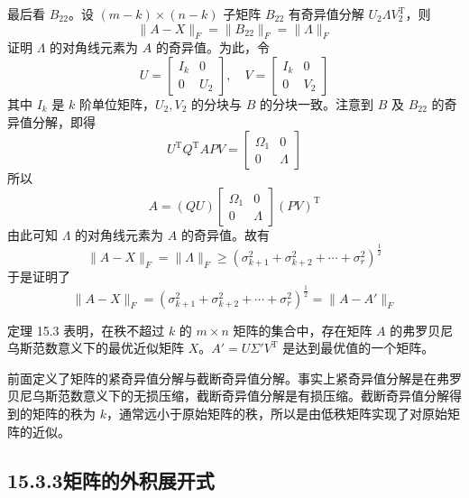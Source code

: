 \documentclass[UTF8,12pt,a4paper,fontset=fandol]{ctexart}
\begin{document}
最后看 $B_{22}$。设 $(m-k)\times(n-k)$ 子矩阵 $B_{22}$ 有奇异值分解 $U_2\Lambda V_2^{\mathrm{T}}$，则
\begin{equation}
\|A-X\|_F=\|B_{22}\|_F=\|\Lambda\|_F
\tag{15.41}
\end{equation}
证明 $\Lambda$ 的对角线元素为 $A$ 的奇异值。为此，令
\[
U=
\begin{bmatrix}
I_k&0\\
0&U_2
\end{bmatrix},\quad
V=
\begin{bmatrix}
I_k&0\\
0&V_2
\end{bmatrix}
\]
其中 $I_k$ 是 $k$ 阶单位矩阵，$U_2,V_2$ 的分块与 $B$ 的分块一致。注意到 $B$ 及 $B_{22}$ 的奇异值分解，即得
\begin{equation}
U^{\mathrm{T}}Q^{\mathrm{T}}APV=
\begin{bmatrix}
\Omega_1&0\\
0&\Lambda
\end{bmatrix}
\tag{15.42}
\end{equation}
所以
\begin{equation}
A=(QU)
\begin{bmatrix}
\Omega_1&0\\
0&\Lambda
\end{bmatrix}
(PV)^{\mathrm{T}}
\tag{15.43}
\end{equation}
由此可知 $\Lambda$ 的对角线元素为 $A$ 的奇异值。故有
\begin{equation}
\|A-X\|_F=\|\Lambda\|_F\geqslant
(\sigma_{k+1}^2+\sigma_{k+2}^2+\cdots+\sigma_r^2)^{\frac12}
\tag{15.44}
\end{equation}
于是证明了
\[
\|A-X\|_F=(\sigma_{k+1}^2+\sigma_{k+2}^2+\cdots+\sigma_r^2)^{\frac12}
=\|A-A'\|_F
\]

定理 15.3 表明，在秩不超过 $k$ 的 $m\times n$ 矩阵的集合中，存在矩阵 $A$ 的弗罗贝尼乌斯范数意义下的最优近似矩阵 $X$。$A'=U\Sigma'V^{\mathrm{T}}$ 是达到最优值的一个矩阵。

前面定义了矩阵的紧奇异值分解与截断奇异值分解。事实上紧奇异值分解是在弗罗贝尼乌斯范数意义下的无损压缩，截断奇异值分解是有损压缩。截断奇异值分解得到的矩阵的秩为 $k$，通常远小于原始矩阵的秩，所以是由低秩矩阵实现了对原始矩阵的近似。

\subsection*{15.3.3\quad 矩阵的外积展开式}
\end{document}
